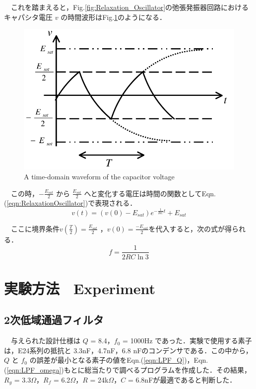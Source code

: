 　これを踏まえると，Fig.\ref{fig:Relaxation_Oscillator}の弛張発振器回路におけるキャパシタ電圧 $v$ の時間波形はFig.\ref{fig:A_time-domain_waveform_of_the_capacitor_voltage}のようになる．
\begin{figure}[H]
    \centering
    \includegraphics[scale=0.5]{./fig/A_time-domain_waveform_of_the_capacitor_voltage.pdf}
    \caption{A time-domain waveform of the capacitor voltage}
    \label{fig:A_time-domain_waveform_of_the_capacitor_voltage}
\end{figure}

　この時，$-\frac{E_{s a t}}{2}$ から $\frac{E_{s a t}}{2}$ へと変化する電圧は時間の関数としてEqn.(\ref{eqn:RelaxationOscillator})で表現される．
\begin{equation}
    v(t)=\left(v(0)-E_{s a t}\right) e^{-\frac{1}{R C} t}+E_{s a t}
    \label{eqn:RelaxationOscillator}
\end{equation}

　ここに境界条件$v\left(\frac{T}{2}\right)=\frac{E_{s a t}}{2}$ ，$v(0)=\frac{-E_{s a t}}{2}$を代入すると，次の式が得られる．
\begin{equation}
    f = \frac{1}{2 R C \ln 3}
    \label{eqn:RelaxationOscillator_f}
\end{equation}


\section{実験方法　Experiment}
\subsection{2次低域通過フィルタ}
　与えられた設計仕様は $Q$ = 8.4，$f_0$ = 1000Hz であった．実験で使用する素子は，E24系列の抵抗と 3.3nF，4.7nF，6.8 nFのコンデンサである．この中から，$Q$ と $f_0$ の誤差が最小となる素子の値をEqn.(\ref{eqn:LPF_Q})，Eqn.(\ref{eqn:LPF_omega})もとに総当たりで調べるプログラムを作成した．その結果，$R_g$ = 3.3$\Omega$，$R_f$ = 6.2$\Omega$，$R$ = 24k$\Omega$，$C$ = 6.8nFが最適であると判断した．

